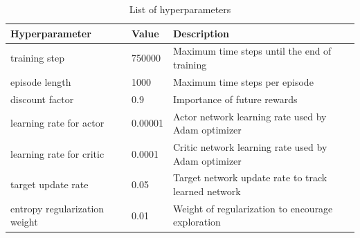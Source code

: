 \begin{table}[h!]
  \centering
  \caption{\small List of hyperparameters}
  \label{table:hyperparameter}
  \begin{tabular}{@{}lllll@{}}
  \toprule
  \textbf{Hyperparameter}       & \textbf{Value} & \multicolumn{3}{l}{\textbf{Description}}                                \\ \midrule
  training step                 & 750000         & \multicolumn{3}{l}{Maximum time steps until the end of training}        \\
  episode length                & 1000            & \multicolumn{3}{l}{Maximum time steps per episode}                      \\
  discount factor               & 0.9            & \multicolumn{3}{l}{Importance of future rewards}                        \\
  learning rate for actor       & 0.00001        & \multicolumn{3}{l}{Actor network learning rate used by Adam optimizer}  \\
  learning rate for critic      & 0.0001         & \multicolumn{3}{l}{Critic network learning rate used by Adam optimizer} \\
  target update rate            & 0.05           & \multicolumn{3}{l}{Target network update rate to track learned network} \\
  entropy regularization weight & 0.01           & \multicolumn{3}{l}{Weight of regularization to encourage exploration}   \\
  \bottomrule
  \end{tabular}
  \end{table}



